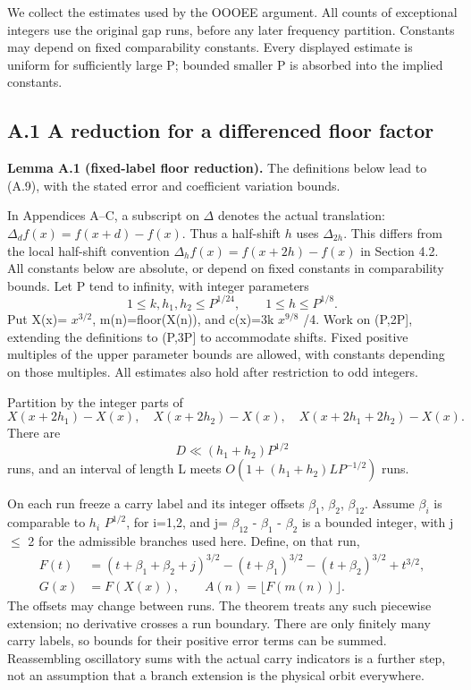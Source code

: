 \documentclass[11pt,a4paper]{article}
\begin{document}
We collect the estimates used by the OOOEE argument. All counts of
exceptional integers use the original gap runs, before any later
frequency partition. Constants may depend on fixed comparability
constants. Every displayed estimate is uniform for sufficiently large P;
bounded smaller P is absorbed into the implied constants.

\subsection{A.1 A reduction for a differenced floor
factor}\label{a.1-a-reduction-for-a-differenced-floor-factor}


\textbf{Lemma A.1 (fixed-label floor reduction).} The definitions below
lead to (A.9), with the stated error and coefficient variation bounds.

In Appendices A--C, a subscript on \(\Delta\) denotes the actual
translation: \(\Delta_d f(x)=f(x+d)-f(x)\). Thus a half-shift \(h\) uses
\(\Delta_{2h}\). This differs from the local half-shift convention
\(\Delta_h f(x)=f(x+2h)-f(x)\) in Section 4.2. All constants below are
absolute, or depend on fixed constants in comparability bounds. Let P
tend to infinity, with integer parameters \[
1\le k,h_1,h_2\le P^{1/24},\qquad 1\le h\le P^{1/8}.
\] Put X(x)= \(x^{3/2}\), m(n)=floor(X(n)), and c(x)=3k \(x^{9/8}\) /4.
Work on (P,2P{]}, extending the definitions to (P,3P{]} to accommodate
shifts. Fixed positive multiples of the upper parameter bounds are
allowed, with constants depending on those multiples. All estimates also
hold after restriction to odd integers.

Partition by the integer parts of \[
X(x+2h_1)-X(x),\quad X(x+2h_2)-X(x),\quad
X(x+2h_1+2h_2)-X(x).
\] There are \[
D\ll (h_1+h_2)P^{1/2}
\] runs, and an interval of length L meets \(O(1+(h_1+h_2)L P^{-1/2})\)
runs.

On each run freeze a carry label and its integer offsets \(\beta_1\),
\(\beta_2\), \(\beta_{12}\). Assume \(\beta_i\) is comparable to \(h_i\)
\(P^{1/2}\), for i=1,2, and j= \(\beta_{12}\) - \(\beta_1\) -
\(\beta_2\) is a bounded integer, with \textbar j\textbar{} \(\le\) 2
for the admissible branches used here. Define, on that run, \[
\begin{split}
F(t)&=(t+\beta_1+\beta_2+j)^{3/2}
-(t+\beta_1)^{3/2}-(t+\beta_2)^{3/2}+t^{3/2},\\
G(x)&=F(X(x)),\qquad A(n)=\lfloor F(m(n))\rfloor.
\end{split}
\] The offsets may change between runs. The theorem treats any such
piecewise extension; no derivative crosses a run boundary. There are
only finitely many carry labels, so bounds for their positive error
terms can be summed. Reassembling oscillatory sums with the actual carry
indicators is a further step, not an assumption that a branch extension
is the physical orbit everywhere.
\end{document}
